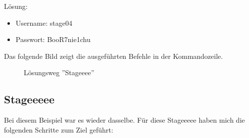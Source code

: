 \documentclass[12pt, a4paper, titlepage, oneside]{scrartcl}
\begin{document}
	Lösung:
	\begin{itemize}
		\item Username: stage04

		\item Passwort: BooR7nie1chu
	\end{itemize}

	Das folgende Bild zeigt die ausgeführten Befehle in der Kommandozeile.
	\begin{figure}[h!]
		\centering
		\caption{Lösungsweg ''Stageeee''}
		\label{fig:stageeee_solution}
	\end{figure}

	\newpage

	\subsection{Stageeeee}
	Bei diesem Beispiel war es wieder dasselbe. Für diese Stageeeee haben mich die
	folgenden Schritte zum Ziel geführt:
\end{document}
